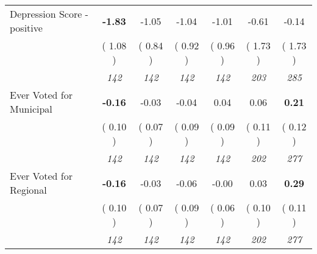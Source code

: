 \begin{tabular}{l c c c c c c}
Depression Score - positive & \textbf{     -1.83 } &     -1.05 &     -1.04 &     -1.01 &     -0.61 &     -0.14 \\
& (     1.08 ) & (     0.84 ) & (     0.92 ) & (     0.96 ) & (     1.73 ) & (     1.73 ) \\
& \textit{ 142 } & \textit{ 142 } & \textit{ 142 } & \textit{ 142 } & \textit{ 203 } & \textit{ 285 } \\
Ever Voted for Municipal & \textbf{     -0.16 } &     -0.03 &     -0.04 &      0.04 &      0.06 & \textbf{      0.21 } \\
& (     0.10 ) & (     0.07 ) & (     0.09 ) & (     0.09 ) & (     0.11 ) & (     0.12 ) \\
& \textit{ 142 } & \textit{ 142 } & \textit{ 142 } & \textit{ 142 } & \textit{ 202 } & \textit{ 277 } \\
Ever Voted for Regional & \textbf{     -0.16 } &     -0.03 &     -0.06 &     -0.00 &      0.03 & \textbf{      0.29 } \\
& (     0.10 ) & (     0.07 ) & (     0.09 ) & (     0.06 ) & (     0.10 ) & (     0.11 ) \\
& \textit{ 142 } & \textit{ 142 } & \textit{ 142 } & \textit{ 142 } & \textit{ 202 } & \textit{ 277 } \\
\bottomrule
\end{tabular}
